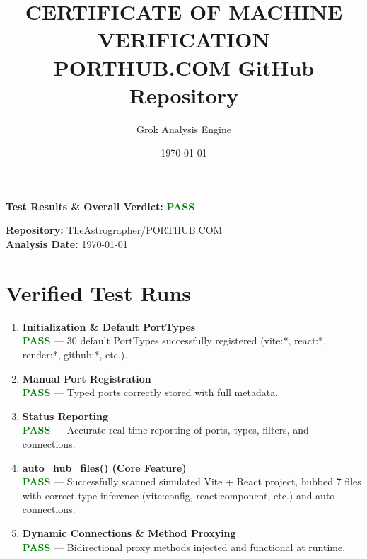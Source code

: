 \documentclass[11pt,a4paper]{article}
\title{\textbf{CERTIFICATE OF MACHINE VERIFICATION} \\[0.5em] 
\Large PORTHUB.COM GitHub Repository}
\author{Grok Analysis Engine}
\date{\today}
\begin{document}
\maketitle

\begin{center}
\textbf{Test Results \& Overall Verdict:} \textcolor{green}{\textbf{PASS}}
\end{center}

\vspace{1em}

\textbf{Repository:} \href{https://github.com/TheAstrographer/PORTHUB.COM}{TheAstrographer/PORTHUB.COM} \\
\textbf{Analysis Date:} \today

\section*{Verified Test Runs}

\begin{enumerate}[label=\textbf{Test \arabic*:}]
    \item \textbf{Initialization \& Default PortTypes} \\
    \textcolor{green}{\textbf{PASS}} — 30 default PortTypes successfully registered (vite:*, react:*, render:*, github:*, etc.).

    \item \textbf{Manual Port Registration} \\
    \textcolor{green}{\textbf{PASS}} — Typed ports correctly stored with full metadata.

    \item \textbf{Status Reporting} \\
    \textcolor{green}{\textbf{PASS}} — Accurate real-time reporting of ports, types, filters, and connections.

    \item \textbf{auto\_hub\_files() (Core Feature)} \\
    \textcolor{green}{\textbf{PASS}} — Successfully scanned simulated Vite + React project, hubbed 7 files with correct type inference (vite:config, react:component, etc.) and auto-connections.

    \item \textbf{Dynamic Connections \& Method Proxying} \\
    \textcolor{green}{\textbf{PASS}} — Bidirectional proxy methods injected and functional at runtime.
\end{enumerate}
\end{document}
